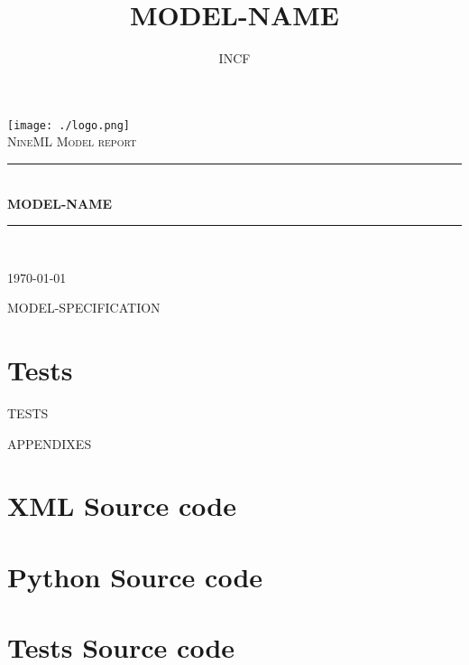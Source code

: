 \documentclass[a4paper]{article}
\title{MODEL-NAME}
\author{INCF}
\newcommand{\HRule}{\rule{\linewidth}{0.2mm}}
\begin{document}
\begin{titlepage}
\begin{center}

\vspace*{5cm}

\texttt{[image: ./logo.png]} \\[1cm]    

\textsc{\Large NineML Model report}\\[0.5cm]

\HRule \\[0.4cm]
{ \huge \bfseries MODEL-NAME}\\[0.4cm]

\HRule \\[1.5cm]

\vfill

{\large \today}

\end{center}
\end{titlepage}
\newpage

\tableofcontents
\newpage

MODEL-SPECIFICATION
\newpage

\section{Tests}

TESTS
\newpage

\appendix

APPENDIXES

\section{XML Source code}

\section{Python Source code}

\section{Tests Source code}

\vfill
\end{document}
